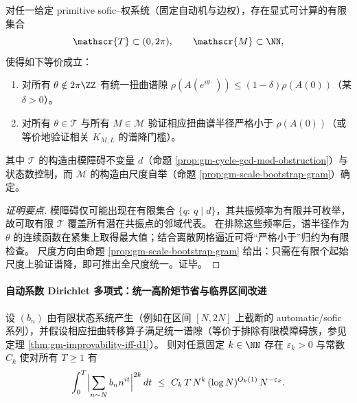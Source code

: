 \begin{theorem}\label{thm:gm-finite-verification-uniform-gap}
对任一给定 primitive sofic--权系统（固定自动机与边权），存在显式可计算的有限集合
\[
\mathscr{T}\subset(0,2\pi),\qquad \mathscr{M}\subset\NN,
\]
使得如下等价成立：
\begin{enumerate}
  \item 对所有 \(\theta\notin 2\pi\ZZ\) 有统一扭曲谱隙 \(\rho(A(e^{i\theta\cdot}))\le (1-\delta)\rho(A(0))\)（某 \(\delta>0\)）。
  \item 对所有 \(\theta\in\mathscr{T}\) 与所有 \(M\in\mathscr{M}\) 验证相应扭曲谱半径严格小于 \(\rho(A(0))\)（或等价地验证相关 \(K_{M,L}\) 的谱降门槛）。
\end{enumerate}
其中 \(\mathscr{T}\) 的构造由模障碍不变量 \(d\)（命题 \ref{prop:gm-cycle-gcd-mod-obstruction}）与状态数控制，而 \(\mathscr{M}\) 的构造由尺度自举（命题 \ref{prop:gm-scale-bootstrap-gram}）确定。
\end{theorem}

\begin{proof}[证明要点]
模障碍仅可能出现在有限集合 \(\{q:\ q\mid d\}\)，其共振频率为有限并可枚举，故可取有限 \(\mathscr{T}\) 覆盖所有潜在共振点的邻域代表。
在排除这些频率后，谱半径作为 \(\theta\) 的连续函数在紧集上取得最大值；结合离散网格逼近可将“严格小于”归约为有限检查。
尺度方向由命题 \ref{prop:gm-scale-bootstrap-gram} 给出：只需在有限个起始尺度上验证谱降，即可推出全尺度统一。证毕。
\end{proof}

\paragraph{自动系数 Dirichlet 多项式：统一高阶矩节省与临界区间改进}
\begin{theorem}\label{thm:gm-automatic-dirichlet-moment-bound}
设 \((b_n)\) 由有限状态系统产生（例如在区间 \([N,2N]\) 上截断的 automatic/sofic 系列），并假设相应扭曲转移算子满足统一谱隙（等价于排除有限模障碍族，参见定理 \ref{thm:gm-improvability-iff-d1}）。
则对任意固定 \(k\in\NN\) 存在 \(\varepsilon_k>0\) 与常数 \(C_k\) 使对所有 \(T\ge 1\) 有
\[
\int_0^T\Bigl|\sum_{n\sim N} b_n n^{it}\Bigr|^{2k}\,dt
\ \le\
C_k\,T\,N^{k}\,(\log N)^{O_k(1)}\,N^{-\varepsilon_k}.
\]
\end{theorem}

